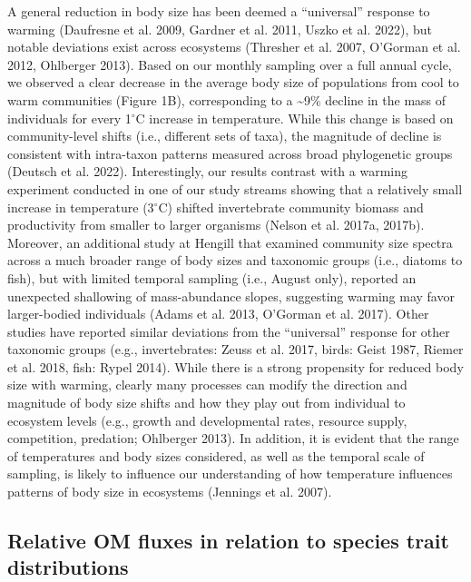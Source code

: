 \documentclass[
]{article}
\numberwithin{equation}
\begin{document}
A general reduction in body size has been deemed a ``universal''
response to warming (Daufresne et al. 2009, Gardner et al. 2011, Uszko
et al. 2022), but notable deviations exist across ecosystems (Thresher
et al. 2007, O'Gorman et al. 2012, Ohlberger 2013). Based on our monthly
sampling over a full annual cycle, we observed a clear decrease in the
average body size of populations from cool to warm communities (Figure
1B), corresponding to a \textasciitilde9\% decline in the mass of
individuals for every 1\(^\circ\)C increase in temperature. While this
change is based on community-level shifts (i.e., different sets of
taxa), the magnitude of decline is consistent with intra-taxon patterns
measured across broad phylogenetic groups (Deutsch et al. 2022).
Interestingly, our results contrast with a warming experiment conducted
in one of our study streams showing that a relatively small increase in
temperature (3\(^\circ\)C) shifted invertebrate community biomass and
productivity from smaller to larger organisms (Nelson et al. 2017a,
2017b). Moreover, an additional study at Hengill that examined community
size spectra across a much broader range of body sizes and taxonomic
groups (i.e., diatoms to fish), but with limited temporal sampling
(i.e., August only), reported an unexpected shallowing of mass-abundance
slopes, suggesting warming may favor larger-bodied individuals (Adams et
al. 2013, O'Gorman et al. 2017). Other studies have reported similar
deviations from the ``universal'' response for other taxonomic groups
(e.g., invertebrates: Zeuss et al. 2017, birds: Geist 1987, Riemer et
al. 2018, fish: Rypel 2014). While there is a strong propensity for
reduced body size with warming, clearly many processes can modify the
direction and magnitude of body size shifts and how they play out from
individual to ecosystem levels (e.g., growth and developmental rates,
resource supply, competition, predation; Ohlberger 2013). In addition,
it is evident that the range of temperatures and body sizes considered,
as well as the temporal scale of sampling, is likely to influence our
understanding of how temperature influences patterns of body size in
ecosystems (Jennings et al. 2007).

\hypertarget{relative-om-fluxes-in-relation-to-species-trait-distributions}{%
\subsection{Relative OM fluxes in relation to species trait
distributions}\label{relative-om-fluxes-in-relation-to-species-trait-distributions}}
\end{document}
